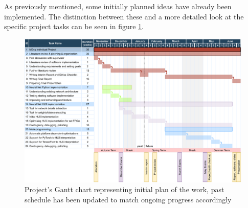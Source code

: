 As previously mentioned, some initially planned ideas have already been implemented. The distinction between these and a more detailed look at the specific project tasks can be seen in figure \ref{fig:gantt-chart}.

\begin{figure}[hpt]
  \centering
  \includegraphics[trim={0cm 0cm 0cm 0cm}, width=1.2\textwidth, center]{project/gantt_chart.pdf}
  \caption{Project's Gantt chart representing initial plan of the work, past schedule has been updated to match ongoing progress accordingly}
  \label{fig:gantt-chart}
\end{figure}
